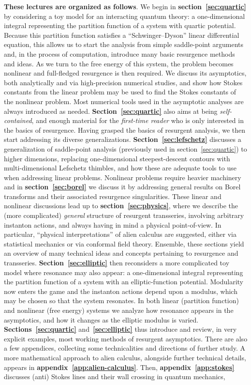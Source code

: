 \documentclass[11pt,a4paper]{article}
\begin{document}
\textbf{These lectures are organized as follows}. We begin in \textbf{section~\ref{sec:quartic}} by considering a toy model for an interacting quantum theory: a one-dimensional integral representing the partition function of a system with quartic potential. Because this partition function satisfies a ``Schwinger--Dyson'' linear differential equation, this allows us to start the analysis from simple saddle-point arguments and, in the process of computation, introduce many basic resurgence methods and ideas. As we turn to the free energy of this system, the problem becomes nonlinear and full-fledged resurgence is then required. We discuss its asymptotics, both analytically and via high-precision numerical studies, and show how Stokes constants from the linear problem may be used to find the Stokes constants of the nonlinear problem. Most numerical tools used in the asymptotic analyses are always introduced as needed. \textbf{Section~\ref{sec:quartic}} also aims at being \textit{self-contained}, and enough material for the \textit{first-time reader} who is only interested in the basics of resurgence. Having grasped the basics of resurgent analysis, we then start addressing its diverse generalizations. \textbf{Section~\ref{sec:lefschetz}} discusses a generalization of saddle-point analysis (previously used in section~\ref{sec:quartic}) to higher dimensions, replacing one-dimensional steepest-descent contours with multi-dimensional Lefschetz thimbles, and how these are adequate tools to use when addressing linear problems. Nonlinear problems require heavier machinery and in \textbf{section~\ref{sec:borel}} we discuss it by addressing general results on Borel transforms and their associated resurgence singularities. These linear and nonlinear discussions lead up to \textbf{section~\ref{sec:physics}}, where we describe the (more complicated) \textit{general} structure of resurgent transseries, involving arbitrary instanton actions, and always having in mind a physical point-of-view. In particular, ``physical interpretations'' of alien calculus are suggested, either via statistical mechanics or via conformal field theory. Ensemble, these sections yield an overview of many technical ideas and concepts pertaining to resurgence and transseries. \textbf{Section~\ref{sec:elliptic}} then reconsiders a more complicated toy model where resonance may also appear: a one-dimensional integral representing the partition function of a system with an elliptic-function potential. Modularity now enters the game and the instanton actions depend upon a modulus, which may be chosen so that the system resonates. In both linear (partition function) and nonlinear (free energy) systems we analyze how resonance appears in the asymptotics, and how it changes as the elliptic modulus is varied. \textbf{Sections~\ref{sec:quartic}} and~\textbf{\ref{sec:elliptic}} thus introduce and review, in very explicit examples, most working methods of resurgent asymptotics. There are also a few appendices, collecting some technicalities and directions of further study. A more mathematical approach to alien calculus, alongside further technical details, appears in \textbf{appendix~\ref{app:alien-calculus}}. Then, \textbf{appendix~\ref{app:stokes}} discusses (anti) Stokes lines and their wall crossing in quantum mechanics, 
\end{document}
